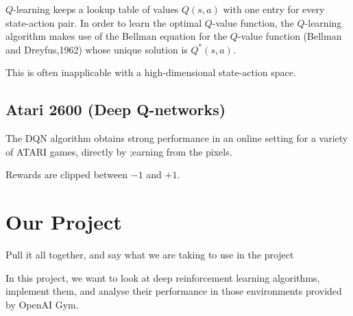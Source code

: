 \documentclass{article}
\begin{document}
$Q$-learning keeps a lookup table of values $Q(s,a)$ with one entry for every state-action pair. In order to learn the optimal $Q$-value function, the $Q$-learning algorithm makes use of the Bellman equation for the $Q$-value function (Bellman and Dreyfus,1962) whose unique solution is $Q^*(s,a)$.

This is often inapplicable with a high-dimensional state-action space.

\subsection{Atari 2600 (Deep Q-networks)}

The DQN algorithm obtains strong performance in an online setting for a variety of ATARI games, directly by ;earning from the pixels.

Rewards are clipped between $-1$ and $+1$.

\section{Our Project}

Pull it all together, and say what we are taking to use in the project

In this project, we want to look at deep reinforcement learning algorithms, implement them, and analyse their performance in those environments provided by OpenAI Gym.

\printbibliography
\end{document}
